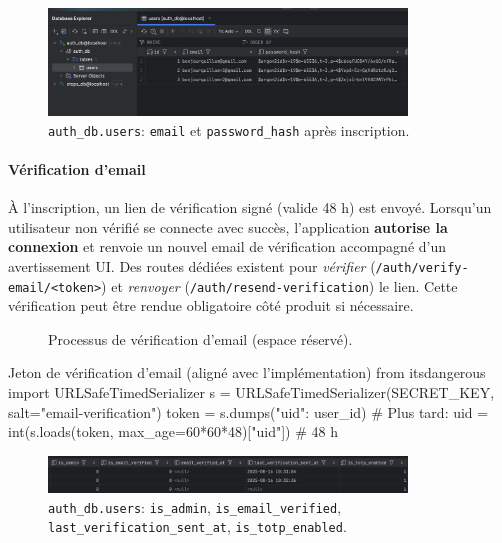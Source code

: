 \begin{itemize}
\begin{figure}[h]
  \centering
  \includegraphics[width=0.85\textwidth]{../figures/chap10/auth_db1.png}
  \caption{\texttt{auth\_db.users}: \texttt{email} et \texttt{password\_hash} après inscription.}
\end{figure}

\paragraph{Vérification d'email}
À l'inscription, un lien de vérification signé (valide 48 h) est envoyé. Lorsqu'un utilisateur non vérifié se connecte avec succès, l'application \textbf{autorise la connexion} et renvoie un nouvel email de vérification accompagné d'un avertissement UI. Des routes dédiées existent pour \textit{vérifier} (\texttt{/auth/verify-email/<token>}) et \textit{renvoyer} (\texttt{/auth/resend-verification}) le lien. Cette vérification peut être rendue obligatoire côté produit si nécessaire.

\begin{figure}[h]
  \centering
  \caption{Processus de vérification d'email (espace réservé).}
\end{figure}

\begin{codebox}[language=Python]{Jeton de vérification d'email (aligné avec l'implémentation)}
from itsdangerous import URLSafeTimedSerializer
s = URLSafeTimedSerializer(SECRET_KEY, salt="email-verification")
token = s.dumps({"uid": user_id})
# Plus tard:  uid = int(s.loads(token, max_age=60*60*48)["uid"])  # 48 h
\end{codebox}

\begin{figure}[h]
  \centering
  \includegraphics[width=0.85\textwidth]{../figures/chap10/auth_db2.png}
  \caption{\texttt{auth\_db.users}: \texttt{is\_admin}, \texttt{is\_email\_verified}, \texttt{last\_verification\_sent\_at}, \texttt{is\_totp\_enabled}.}
\end{figure}


\end{itemize}
